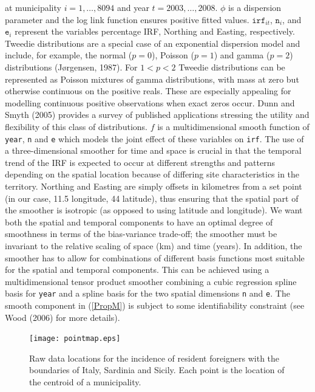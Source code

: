 \documentclass[12pt]{article}
\theoremstyle{definition}
\theoremstyle{plain}
\begin{document}
at municipality $i=1,\ldots,8094$ and year $t=2003,\ldots,2008$. $\phi$ is a dispersion parameter and the log link function ensures positive fitted values. $\texttt{irf}_{it}$, $\texttt{n}_i$, and $\texttt{e}_i$ represent the variables percentage IRF, Northing and Easting, respectively. Tweedie distributions are a special case of an exponential dispersion model and include, for example, the normal ($p=0$), Poisson ($p=1$) and gamma ($p=2$) distributions (J\o rgensen, 1987). For $1<p<2$ Tweedie distributions can be represented as Poisson mixtures of gamma distributions, with mass at zero but otherwise continuous on the positive reals. These are especially appealing for modelling continuous positive observations when exact zeros occur. Dunn and Smyth (2005) provides a survey of published applications stressing the utility and flexibility of this class of distributions. $f$ is a multidimensional smooth function of \texttt{year}, \texttt{n} and \texttt{e} which models the joint effect of these variables on \texttt{irf}. The use of a three-dimensional smoother for time and space is crucial in that the temporal trend of the IRF is expected to occur at different strengths and patterns depending on the spatial location because of differing site characteristics in the territory. Northing and Easting are simply offsets in kilometres from a set point (in our case, 11.5 longitude, 44 latitude), thus ensuring that the spatial part of the smoother is isotropic (as opposed to using latitude and longitude). We want both the spatial and temporal components to have an optimal degree of smoothness in terms of the bias-variance trade-off; the smoother must be invariant to the relative scaling of space (km) and time (years). In addition, the smoother has to allow for combinations of different basis functions most suitable for the spatial and temporal components. This can be achieved using a multidimensional tensor product smoother combining a cubic regression spline basis for \texttt{year} and a spline basis for the two spatial dimensions \texttt{n} and \texttt{e}. The smooth component in (\ref{PropM}) is subject to some identifiability constraint (see Wood (2006) for more details).

\begin{figure}[tbp]
	\centering
		\texttt{[image: pointmap.eps]}
	\caption{Raw data locations for the incidence of resident foreigners with the boundaries of Italy, Sardinia and Sicily. Each point is the location of the centroid of a municipality.}
	\label{pointmap}
\end{figure}
\end{document}
